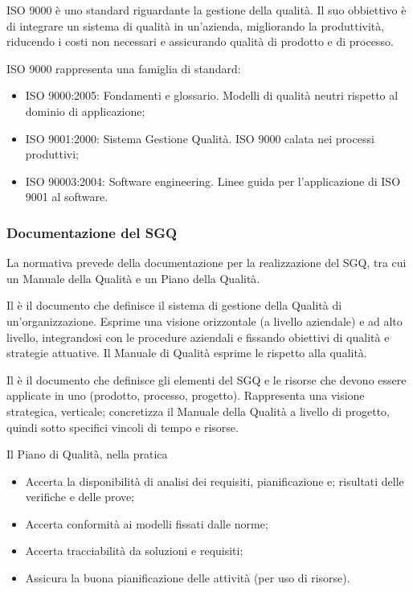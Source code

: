 ISO 9000 è uno standard riguardante la gestione della qualità. Il suo obbiettivo
è di integrare un sistema di qualità in un'azienda, migliorando la produttività,
riducendo i costi non necessari e assicurando qualità di prodotto e di processo.

ISO 9000 rappresenta una famiglia di standard:

\begin{itemize}
  \item ISO 9000:2005: Fondamenti e glossario. Modelli di qualità neutri
    rispetto al dominio di applicazione;
  \item ISO 9001:2000: Sistema Gestione Qualità. ISO 9000 calata nei processi
    produttivi;
  \item ISO 90003:2004: Software engineering. Linee guida per l'applicazione di
    ISO 9001 al software.
\end{itemize}

\subsubsection{Documentazione del SGQ} %
\label{ssub:documentazione_del_sgq}

La normativa prevede della documentazione per la realizzazione del SGQ, tra cui
un Manuale della Qualità e un Piano della Qualità.

Il  è il documento che definisce il sistema di
gestione della Qualità di un'organizzazione. Esprime una visione orizzontale (a
livello aziendale) e ad alto livello, integrandosi con le procedure aziendali e
fissando obiettivi di qualità e strategie attuative. Il Manuale di Qualità
esprime le  rispetto alla qualità.

Il  è il documento che definisce gli elementi del
SGQ e le risorse che devono essere applicate in uno 
(prodotto, processo, progetto). Rappresenta una visione strategica, verticale;
concretizza il Manuale della Qualità a livello di progetto, quindi sotto
specifici vincoli di tempo e risorse.

Il Piano di Qualità, nella pratica

\begin{itemize}
  \item Accerta la disponibilità di analisi dei requisiti, pianificazione e;
  risultati delle verifiche e delle prove;
  \item Accerta conformità ai modelli fissati dalle norme;
  \item Accerta tracciabilità da soluzioni e requisiti;
  \item Assicura la buona pianificazione delle attività (per uso di risorse).
\end{itemize}
